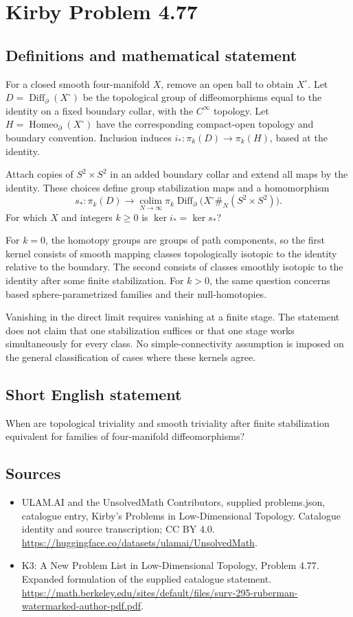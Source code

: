 \documentclass[11pt,a4paper]{article}
\begin{document}
\section*{Kirby Problem 4.77}\label{statement}

\subsection{Definitions and mathematical statement}
For a closed smooth four-manifold $X$, remove an open ball to obtain $X^\circ$. Let $D=\operatorname{Diff}_\partial(X^\circ)$ be the topological group of diffeomorphisms equal to the identity on a fixed boundary collar, with the $C^\infty$ topology. Let $H=\operatorname{Homeo}_\partial(X^\circ)$ have the corresponding compact-open topology and boundary convention. Inclusion induces $i_*:\pi_k(D)\to\pi_k(H)$, based at the identity.

Attach copies of $S^2\times S^2$ in an added boundary collar and extend all maps by the identity. These choices define group stabilization maps and a homomorphism
\[
s_*:\pi_k(D)\longrightarrow
\operatorname*{colim}_{N\to\infty}
\pi_k\operatorname{Diff}_\partial
\bigl(X^\circ\#_N(S^2\times S^2)\bigr).
\]
For which $X$ and integers $k\ge0$ is $\ker i_*=\ker s_*$?

For $k=0$, the homotopy groups are groups of path components, so the first kernel consists of smooth mapping classes topologically isotopic to the identity relative to the boundary. The second consists of classes smoothly isotopic to the identity after some finite stabilization. For $k>0$, the same question concerns based sphere-parametrized families and their null-homotopies.

Vanishing in the direct limit requires vanishing at a finite stage. The statement does not claim that one stabilization suffices or that one stage works simultaneously for every class. No simple-connectivity assumption is imposed on the general classification of cases where these kernels agree.
\subsection{Short English statement}
When are topological triviality and smooth triviality after finite stabilization equivalent for families of four-manifold diffeomorphisms?
\subsection{Sources}
\begin{itemize}
\item[S1] ULAM.AI and the UnsolvedMath Contributors, supplied problems.json, catalogue entry, Kirby's Problems in Low-Dimensional Topology. Catalogue identity and source transcription; CC BY 4.0.
\url{https://huggingface.co/datasets/ulamai/UnsolvedMath}.
\item[S2] K3: A New Problem List in Low-Dimensional Topology, Problem 4.77. Expanded formulation of the supplied catalogue statement.
\url{https://math.berkeley.edu/sites/default/files/surv-295-ruberman-watermarked-author-pdf.pdf}.
\end{itemize}
\end{document}
